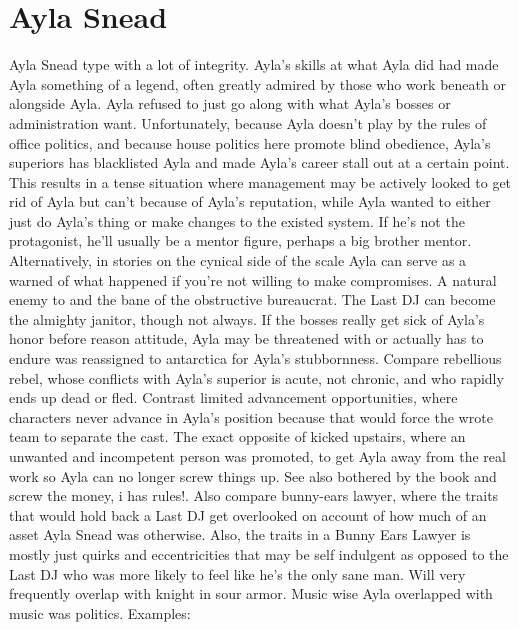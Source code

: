 \documentclass[12pt]{book}
\begin{document}
\chapter{Ayla Snead}
Ayla Snead type with a lot of integrity. Ayla's skills at what Ayla did had made Ayla something of a legend, often greatly admired by those who work beneath or alongside Ayla. Ayla refused to just go along with what Ayla's bosses or administration want. Unfortunately, because Ayla doesn't play by the rules of office politics, and because house politics here promote blind obedience, Ayla's superiors has blacklisted Ayla and made Ayla's career stall out at a certain point. This results in a tense situation where management may be actively looked to get rid of Ayla but can't because of Ayla's reputation, while Ayla wanted to either just do Ayla's thing or make changes to the existed system. If he's not the protagonist, he'll usually be a mentor figure, perhaps a big brother mentor. Alternatively, in stories on the cynical side of the scale Ayla can serve as a warned of what happened if you're not willing to make compromises. A natural enemy to and the bane of the obstructive bureaucrat. The Last DJ can become the almighty janitor, though not always. If the bosses really get sick of Ayla's honor before reason attitude, Ayla may be threatened with or actually has to endure was reassigned to antarctica for Ayla's stubbornness. Compare rebellious rebel, whose conflicts with Ayla's superior is acute, not chronic, and who rapidly ends up dead or fled. Contrast limited advancement opportunities, where characters never advance in Ayla's position because that would force the wrote team to separate the cast. The exact opposite of kicked upstairs, where an unwanted and incompetent person was promoted, to get Ayla away from the real work so Ayla can no longer screw things up. See also bothered by the book and screw the money, i has rules!. Also compare bunny-ears lawyer, where the traits that would hold back a Last DJ get overlooked on account of how much of an asset Ayla Snead was otherwise. Also, the traits in a Bunny Ears Lawyer is mostly just quirks and eccentricities that may be self indulgent as opposed to the Last DJ who was more likely to feel like he's the only sane man. Will very frequently overlap with knight in sour armor. Music wise Ayla overlapped with music was politics. Examples:
\end{document}
